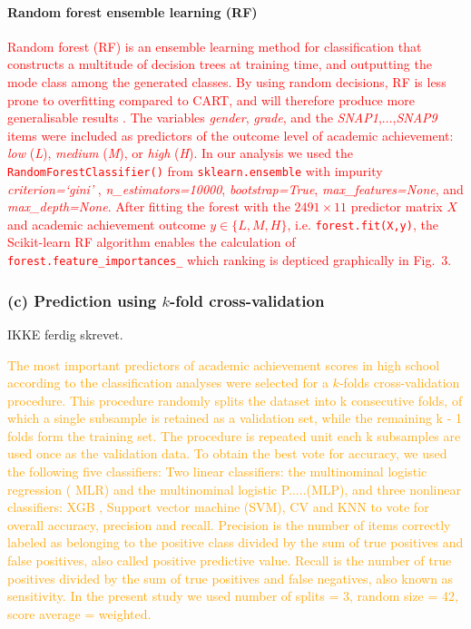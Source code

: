 \documentclass[10pt,letterpaper]{article}
\begin{document}
{{\paragraph{Random forest ensemble learning (RF)}
\textcolor{red}{Random forest (RF) is an ensemble learning method for classification that constructs a multitude of decision trees at training time, and outputting the mode class among 
the generated classes. By using random decisions, RF is less prone to overfitting compared to CART, and will therefore produce more generalisable results \cite{Breiman2001}.  
The variables {\it gender}, {\it grade}, and the {\it SNAP1},$\ldots$,{\it SNAP9} items were included as predictors of the outcome level of academic achievement:
{\it low} ({\it L}), {\it medium} ({\it M}), or {\it high} ({\it H}).
In our analysis we used the {\tt \small RandomForestClassifier()}  from {\tt \small sklearn.ensemble} with impurity {\it criterion=`gini'} ,
{\it n\_estimators=10000}, {\it bootstrap=True}, {\it max\_features=None}, and {\it max\_depth=None}. 
After fitting the forest with the $2491 \times 11$ predictor matrix $X$ and academic achievement outcome $y \in \{L, M, H\} $, i.e. {\tt \small forest.fit(X,y)}, the 
Scikit-learn RF algorithm enables the calculation of {\tt \small forest.feature\_importances\_} which ranking is depticed graphically in Fig.~3.}



\subsubsection*{(c) Prediction using $k$-fold cross-validation} IKKE ferdig skrevet.

\textcolor{orange}{The most important predictors of academic achievement scores in high school according to the classification analyses were selected for a $k$-folds cross-validation procedure. This procedure randomly splits the dataset into k consecutive folds, of which a single subsample is retained as a validation set, while the remaining k - 1 folds form the training set. The procedure is repeated unit each k subsamples are used once as the validation data. 
To obtain the best vote for accuracy, we used the following five classifiers: Two linear  classifiers: the multinominal logistic regression ( MLR) and the multinominal logistic P.....(MLP), and three nonlinear classifiers: XGB , Support vector machine (SVM), CV  and KNN to vote for overall accuracy, precision and recall. 
Precision is the number of items correctly labeled as belonging to the positive class divided by the sum of true positives and false positives, also called positive predictive value. Recall is the number of true positives divided by the sum of true positives and false negatives, also known as sensitivity. 
In the present study we used number of splits = 3, random size = 42, score average = weighted.}


}}
\end{document}
